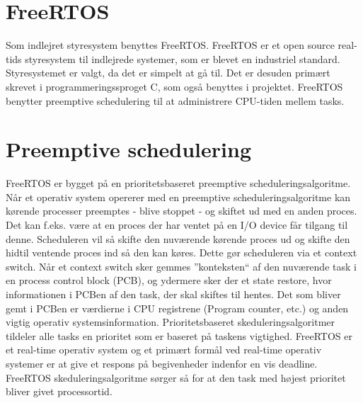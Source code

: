 \section{FreeRTOS}
Som indlejret styresystem benyttes FreeRTOS. 
FreeRTOS er et open source real-tids styresystem til indlejrede systemer, som er blevet en industriel standard. 
Styresystemet er valgt, da det er simpelt at gå til. 
Det er desuden primært skrevet i programmeringssproget C, som også benyttes i projektet. 
FreeRTOS benytter preemptive schedulering til at administrere CPU-tiden mellem tasks. 

\section{Preemptive schedulering}
FreeRTOS er bygget på en prioritetsbaseret preemptive scheduleringsalgoritme.\newline
Når et operativ system opererer med en preemptive scheduleringsalgoritme kan kørende processer preemptes - blive stoppet - og skiftet ud med en anden proces.\newline
Det kan f.eks. være at en proces der har ventet på en I/O device får tilgang til denne.
Scheduleren vil så skifte den nuværende kørende proces ud og skifte den hidtil ventende proces ind så den kan køres.
Dette gør scheduleren via et context switch.\newline
Når et context switch sker gemmes ''konteksten`` af den nuværende task i en process control block (PCB), og ydermere sker der et state restore, hvor informationen i PCBen af den task, der skal skiftes til hentes.
Det som bliver gemt i PCBen er værdierne i CPU registrene (Program counter, etc.) og anden vigtig operativ systemsinformation.\newline
Prioritetsbaseret skeduleringsalgoritmer tildeler alle tasks en prioritet som er baseret på taskens vigtighed.\newline
FreeRTOS er et real-time operativ system og et primært formål ved real-time operativ systemer er at give et respons på begivenheder indenfor en vis deadline.
FreeRTOS skeduleringsalgoritme sørger så for at den task med højest prioritet bliver givet processortid.

